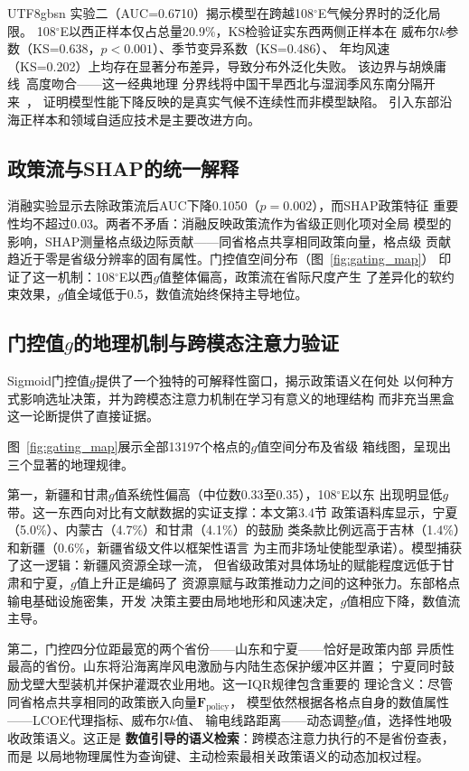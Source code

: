 \documentclass[12pt, a4paper]{article}
\begin{document}
\begin{CJK}{UTF8}{gbsn}
实验二（AUC=0.6710）揭示模型在跨越108$^\circ$E气候分界时的泛化局限。
108$^\circ$E以西正样本仅占总量20.9\%，KS检验证实东西两侧正样本在
威布尔$k$参数（KS=0.638，$p<0.001$）、季节变异系数（KS=0.486）、
年均风速（KS=0.202）上均存在显著分布差异，导致分布外泛化失败。
该边界与胡焕庸线~\cite{chen2016huline}高度吻合——这一经典地理
分界线将中国干旱西北与湿润季风东南分隔开来~\cite{zhao2023windchina}，
证明模型性能下降反映的是真实气候不连续性而非模型缺陷。
引入东部沿海正样本和领域自适应技术是主要改进方向。

\subsection{政策流与SHAP的统一解释}

消融实验显示去除政策流后AUC下降0.1050（$p=0.002$），而SHAP政策特征
重要性均不超过0.03。两者不矛盾：消融反映政策流作为省级正则化项对全局
模型的影响，SHAP测量格点级边际贡献——同省格点共享相同政策向量，格点级
贡献趋近于零是省级分辨率的固有属性。门控值空间分布（图~\ref{fig:gating_map}）
印证了这一机制：108$^\circ$E以西$g$值整体偏高，政策流在省际尺度产生
了差异化的软约束效果，$g$值全域低于0.5，数值流始终保持主导地位。

\subsection{门控值$g$的地理机制与跨模态注意力验证}
\label{sec:gating}

Sigmoid门控值$g$提供了一个独特的可解释性窗口，揭示政策语义在何处
以何种方式影响选址决策，并为跨模态注意力机制在学习有意义的地理结构
而非充当黑盒这一论断提供了直接证据。

图~\ref{fig:gating_map}展示全部13197个格点的$g$值空间分布及省级
箱线图，呈现出三个显著的地理规律。

第一，新疆和甘肃$g$值系统性偏高（中位数0.33至0.35），108$^\circ$E以东
出现明显低$g$带。这一东西向对比有文献数据的实证支撑：本文第3.4节
政策语料库显示，宁夏（5.0\%）、内蒙古（4.7\%）和甘肃（4.1\%）的鼓励
类条款比例远高于吉林（1.4\%）和新疆（0.6\%，新疆省级文件以框架性语言
为主而非场址使能型承诺）。模型捕获了这一逻辑：新疆风资源全球一流，
但省级政策对具体场址的赋能程度远低于甘肃和宁夏，$g$值上升正是编码了
资源禀赋与政策推动力之间的这种张力。东部格点输电基础设施密集，开发
决策主要由局地地形和风速决定，$g$值相应下降，数值流主导。

第二，门控四分位距最宽的两个省份——山东和宁夏——恰好是政策内部
异质性最高的省份。山东将沿海离岸风电激励与内陆生态保护缓冲区并置；
宁夏同时鼓励戈壁大型装机并保护灌溉农业用地。这一IQR规律包含重要的
理论含义：尽管同省格点共享相同的政策嵌入向量$\mathbf{F}_\text{policy}$，
模型依然根据各格点自身的数值属性——LCOE代理指标、威布尔$k$值、
输电线路距离——动态调整$g$值，选择性地吸收政策语义。这正是
\textbf{数值引导的语义检索}：跨模态注意力执行的不是省份查表，而是
以局地物理属性为查询键、主动检索最相关政策语义的动态加权过程。


\end{CJK}
\end{document}
